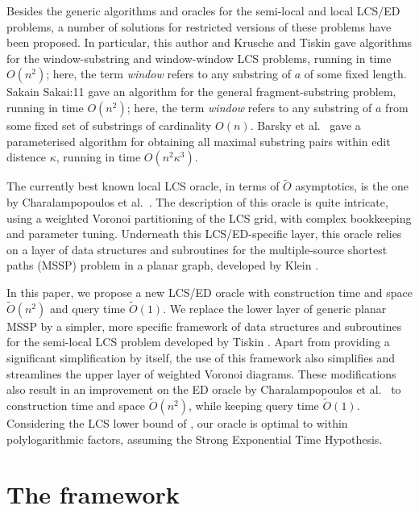 \documentclass[a4paper,UKenglish,cleveref]{lipics-v2021}
\begin{document}
Besides the generic algorithms and oracles for the semi-local and local LCS/ED problems,
a number of solutions for restricted versions of these problems have been proposed.
In particular, this author \cite{Tiskin:08_MCS} and Krusche and Tiskin \cite{Krusche_Tiskin:10}
gave algorithms for the window-substring and window-window LCS problems, running in time $O(n^2)$;
here, the term \emph{window} refers to any substring of $a$ of some fixed length.
Sakain {Sakai:11} gave an algorithm for the general fragment-substring problem, running in time $O(n^2)$;
here, the term \emph{window} refers to any substring of $a$ 
from some fixed set of substrings of cardinality $O(n)$.
Barsky et al.\ \cite{Barsky+:08} gave a parameterised algorithm for obtaining
all maximal substring pairs within edit distence $\kappa$, running in time $O(n^2 \kappa^3)$.

The currently best known local LCS oracle, in terms of $\tilde O$ asymptotics, 
is the one by Charalampopoulos et al.\ \cite{Charalampopoulos+:21}.
The description of this oracle is quite intricate,
using a weighted Voronoi partitioning of the LCS grid, with complex bookkeeping and parameter tuning.
Underneath this LCS/ED-specific layer, this oracle relies on a layer of data structures and subroutines 
for the multiple-source shortest paths (MSSP) problem in a planar graph, developed by Klein \cite{Klein}.

In this paper, we propose a new LCS/ED oracle 
with construction time and space $\tilde O(n^2)$ and query time $\tilde O(1)$.
We replace the lower layer of generic planar MSSP
by a simpler, more specific framework of data structures and subroutines
for the semi-local LCS problem developed by Tiskin \cite{Tiskin}.
Apart from providing a significant simplification by itself,
the use of this framework also simplifies and streamlines the upper layer of weighted Voronoi diagrams.
These modifications also result in an improvement on the ED oracle by Charalampopoulos et al.\ \cite{Ch} 
to construction time and space $\tilde O(n^2)$, while keeping query time $\tilde O(1)$.
Considering the LCS lower bound of \cite{xxx},
our oracle is optimal to within polylogarithmic factors, assuming the Strong Exponential Time Hypothesis.

\section{The framework}
\label{s-framework}
\end{document}
